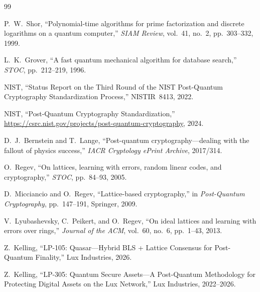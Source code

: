 \documentclass[11pt,a4paper]{article}
\begin{document}

\begin{thebibliography}{99}

P.~W.~Shor, ``Polynomial-time algorithms for prime factorization and
discrete logarithms on a quantum computer,'' \textit{SIAM Review},
vol.~41, no.~2, pp.~303--332, 1999.

L.~K.~Grover, ``A fast quantum mechanical algorithm for database
search,'' \textit{STOC}, pp.~212--219, 1996.

NIST, ``Status Report on the Third Round of the NIST Post-Quantum
Cryptography Standardization Process,'' NISTIR~8413, 2022.

NIST, ``Post-Quantum Cryptography Standardization,''
\url{https://csrc.nist.gov/projects/post-quantum-cryptography}, 2024.

D.~J.~Bernstein and T.~Lange, ``Post-quantum cryptography---dealing
with the fallout of physics success,'' \textit{IACR Cryptology ePrint
Archive}, 2017/314.

O.~Regev, ``On lattices, learning with errors, random linear codes,
and cryptography,'' \textit{STOC}, pp.~84--93, 2005.

D.~Micciancio and O.~Regev, ``Lattice-based cryptography,'' in
\textit{Post-Quantum Cryptography}, pp.~147--191, Springer, 2009.

V.~Lyubashevsky, C.~Peikert, and O.~Regev, ``On ideal lattices and
learning with errors over rings,'' \textit{Journal of the ACM},
vol.~60, no.~6, pp.~1--43, 2013.

Z.~Kelling, ``LP-105: Quasar---Hybrid BLS + Lattice Consensus for
Post-Quantum Finality,'' Lux Industries, 2026.

Z.~Kelling, ``LP-305: Quantum Secure Assets---A Post-Quantum
Methodology for Protecting Digital Assets on the Lux Network,''
Lux Industries, 2022--2026.

\end{thebibliography}
\end{document}
